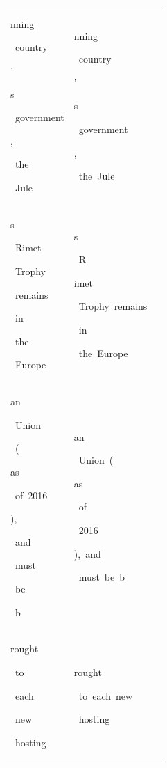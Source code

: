 \begin{table}[h]
\begin{tabular}{ l | l | l }
 \colorbox{cm_20!40}{\strut nning}\colorbox{cm_48!40}{\strut \ country}\colorbox{cm_49!40}{\strut '}\colorbox{cm_32!40}{\strut s}\colorbox{cm_35!40}{\strut \ government}\colorbox{cm_31!40}{\strut ,}\colorbox{cm_33!40}{\strut \ the}\colorbox{cm_14!40}{\strut \ Jule} & \colorbox{cm_25!40}{\strut nning}\colorbox{cm_0!40}{\strut \ country}\colorbox{cm_12!40}{\strut '}\colorbox{cm_25!40}{\strut s}\colorbox{cm_0!40}{\strut \ government}\colorbox{cm_12!40}{\strut ,}\colorbox{cm_25!40}{\strut \ the\ Jule} &  \\ 
 \colorbox{cm_14!40}{\strut s}\colorbox{cm_32!40}{\strut \ Rimet}\colorbox{cm_29!40}{\strut \ Trophy}\colorbox{cm_26!40}{\strut \ remains}\colorbox{cm_33!40}{\strut \ in}\colorbox{cm_22!40}{\strut \ the}\colorbox{cm_32!40}{\strut \ Europe} & \colorbox{cm_25!40}{\strut s}\colorbox{cm_38!40}{\strut \ R}\colorbox{cm_51!40}{\strut imet}\colorbox{cm_0!40}{\strut \ Trophy\ remains}\colorbox{cm_12!40}{\strut \ in}\colorbox{cm_25!40}{\strut \ the\ Europe} &  \\ 
 \colorbox{cm_32!40}{\strut an}\colorbox{cm_47!40}{\strut \ Union}\colorbox{cm_38!40}{\strut \ (}\colorbox{cm_36!40}{\strut as}\colorbox{cm_32!40}{\strut \ of\ 2016}\colorbox{cm_33!40}{\strut ),}\colorbox{cm_29!40}{\strut \ and}\colorbox{cm_42!40}{\strut \ must}\colorbox{cm_34!40}{\strut \ be}\colorbox{cm_40!40}{\strut \ b} & \colorbox{cm_25!40}{\strut an}\colorbox{cm_12!40}{\strut \ Union\ (}\colorbox{cm_0!40}{\strut as}\colorbox{cm_12!40}{\strut \ of}\colorbox{cm_0!40}{\strut \ 2016}\colorbox{cm_12!40}{\strut ),\ and}\colorbox{cm_0!40}{\strut \ must\ be\ b} &  \\ 
 \colorbox{cm_40!40}{\strut rought}\colorbox{cm_27!40}{\strut \ to}\colorbox{cm_33!40}{\strut \ each}\colorbox{cm_27!40}{\strut \ new}\colorbox{cm_40!40}{\strut \ hosting} & \colorbox{cm_0!40}{\strut rought}\colorbox{cm_12!40}{\strut \ to\ each\ new}\colorbox{cm_0!40}{\strut \ hosting} &  \\ 
  \hline 
    \end{tabular}
      \label{tab:data_wikivsc4}
  \end{table}